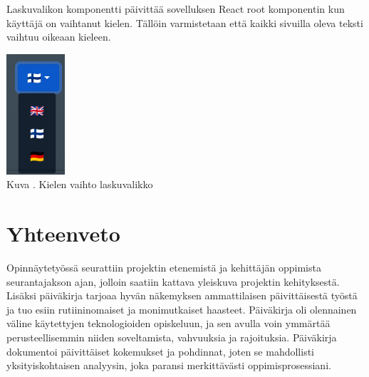 \documentclass[11pt,a4paper,titlepage,oneside]{article}
\begin{document}
Laskuvalikon komponentti päivittää sovelluksen React root komponentin kun käyttäjä on vaihtanut kielen.
Tällöin varmistetaan että kaikki sivuilla oleva teksti vaihtuu oikeaan kieleen.
\medskip


\bigskip
\includegraphics[]{src/public/locale_laskuvalikko.png}\\
Kuva \getImgCount {}. Kielen vaihto laskuvalikko













\newpage
{} %










\newpage
\section{Yhteenveto}             %



%




Opinnäytetyössä seurattiin projektin etenemistä ja kehittäjän oppimista seurantajakson ajan,
jolloin saatiin kattava yleiskuva projektin kehityksestä.
Lisäksi päiväkirja tarjoaa hyvän näkemyksen ammattilaisen päivittäisestä työstä ja tuo esiin rutiininomaiset ja monimutkaiset haasteet. 
Päiväkirja oli olennainen väline käytettyjen teknologioiden opiskeluun,
ja sen avulla voin ymmärtää perusteellisemmin niiden soveltamista, vahvuuksia ja rajoituksia. 
Päiväkirja dokumentoi päivittäiset kokemukset ja pohdinnat,
joten se mahdollisti yksityiskohtaisen analyysin, joka paransi merkittävästi oppimisprosessiani.
\medskip
\end{document}
